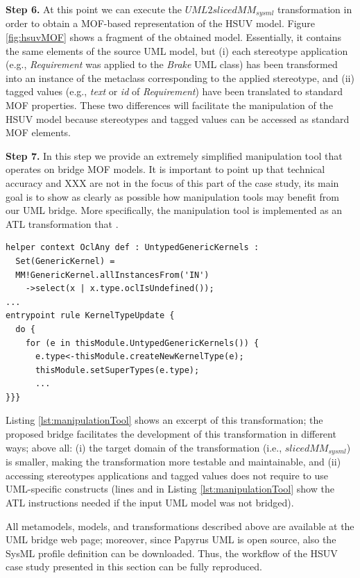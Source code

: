 %
\textbf{Step 6.} At this point we can execute the $UML2slicedMM_{sysml}$ transformation in order to obtain a MOF-based representation
of the HSUV model. Figure \ref{fig:hsuvMOF} shows a fragment of the obtained model. 
Essentially, it contains the same elements of the source UML model, but (i) each stereotype application (e.g., \textit{Requirement}
was applied to the \textit{Brake} UML class)
has been transformed into an instance of the metaclass corresponding to the applied stereotype,
and (ii) tagged values (e.g., \textit{text} or \textit{id} of \textit{Requirement}) 
have been translated to standard MOF properties. These two differences will facilitate
the manipulation of the HSUV model because stereotypes and tagged values can be accessed as standard MOF elements.

\textbf{Step 7.} In this step we provide an extremely simplified manipulation tool that operates on bridge MOF models. 
It is important to point up that technical accuracy and XXX are not in the focus of this part of the case study, 
its main goal is to show as clearly as possible how manipulation tools may benefit from our UML bridge. 
More specifically, the manipulation tool is implemented as an ATL transformation that .
%
\begin{lstlisting}[breaklines,style=AMMA,language=ATL,mathescape,rulesepcolor=\color{black},caption=ATL transformation working on MOF-based SysML models,captionpos=b,label={lst:manipulationTool}]
helper context OclAny def : UntypedGenericKernels : 
  Set(GenericKernel) = 
  MM!GenericKernel.allInstancesFrom('IN')
    ->select(x | x.type.oclIsUndefined());
...
entrypoint rule KernelTypeUpdate {
  do {
    for (e in thisModule.UntypedGenericKernels()) {
      e.type<-thisModule.createNewKernelType(e);
      thisModule.setSuperTypes(e.type);
      ...
}}}
\end{lstlisting}

Listing \ref{lst:manipulationTool} shows an excerpt of this transformation; the proposed bridge facilitates
the development of this transformation in different ways; above all: 
(i) the target domain of the transformation (i.e., $slicedMM_{sysml}$) is smaller, 
making the transformation more testable and maintainable, and 
(ii) accessing stereotypes applications and tagged values 
does not require to use UML-specific constructs (lines  and  in Listing \ref{lst:manipulationTool} 
show the ATL instructions needed if the input UML model was not bridged).  



All metamodels, models, and transformations described above are available at the UML bridge web page;
moreover, since Papyrus UML is open source, also the SysML profile definition can be downloaded.
Thus, the workflow of the HSUV case study presented in this section can be fully reproduced.


